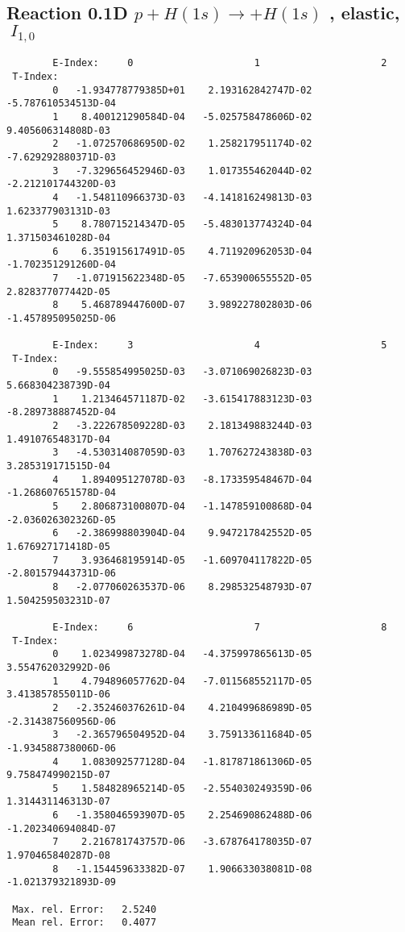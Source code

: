 \documentclass[12pt]{article}
\begin{document}
\subsection{
Reaction 0.1D  $p + H(1s) \rightarrow  + H(1s)$ ,
elastic, $\ I_{1,0}$
}

\begin{small}\begin{verbatim}
        E-Index:     0                     1                     2
 T-Index:
        0   -1.934778779385D+01    2.193162842747D-02   -5.787610534513D-04
        1    8.400121290584D-04   -5.025758478606D-02    9.405606314808D-03
        2   -1.072570686950D-02    1.258217951174D-02   -7.629292880371D-03
        3   -7.329656452946D-03    1.017355462044D-02   -2.212101744320D-03
        4   -1.548110966373D-03   -4.141816249813D-03    1.623377903131D-03
        5    8.780715214347D-05   -5.483013774324D-04    1.371503461028D-04
        6    6.351915617491D-05    4.711920962053D-04   -1.702351291260D-04
        7   -1.071915622348D-05   -7.653900655552D-05    2.828377077442D-05
        8    5.468789447600D-07    3.989227802803D-06   -1.457895095025D-06

        E-Index:     3                     4                     5
 T-Index:
        0   -9.555854995025D-03   -3.071069026823D-03    5.668304238739D-04
        1    1.213464571187D-02   -3.615417883123D-03   -8.289738887452D-04
        2   -3.222678509228D-03    2.181349883244D-03    1.491076548317D-04
        3   -4.530314087059D-03    1.707627243838D-03    3.285319171515D-04
        4    1.894095127078D-03   -8.173359548467D-04   -1.268607651578D-04
        5    2.806873100807D-04   -1.147859100868D-04   -2.036026302326D-05
        6   -2.386998803904D-04    9.947217842552D-05    1.676927171418D-05
        7    3.936468195914D-05   -1.609704117822D-05   -2.801579443731D-06
        8   -2.077060263537D-06    8.298532548793D-07    1.504259503231D-07

        E-Index:     6                     7                     8
 T-Index:
        0    1.023499873278D-04   -4.375997865613D-05    3.554762032992D-06
        1    4.794896057762D-04   -7.011568552117D-05    3.413857855011D-06
        2   -2.352460376261D-04    4.210499686989D-05   -2.314387560956D-06
        3   -2.365796504952D-04    3.759133611684D-05   -1.934588738006D-06
        4    1.083092577128D-04   -1.817871861306D-05    9.758474990215D-07
        5    1.584828965214D-05   -2.554030249359D-06    1.314431146313D-07
        6   -1.358046593907D-05    2.254690862488D-06   -1.202340694084D-07
        7    2.216781743757D-06   -3.678764178035D-07    1.970465840287D-08
        8   -1.154459633382D-07    1.906633038081D-08   -1.021379321893D-09

 Max. rel. Error:   2.5240
 Mean rel. Error:   0.4077
\end{verbatim}\end{small}
\end{document}
